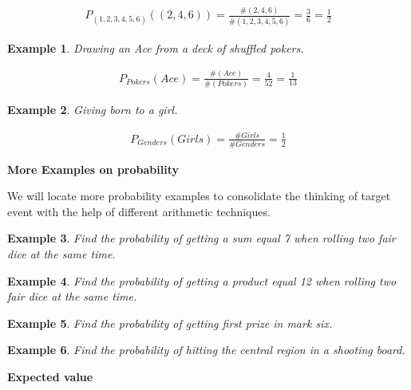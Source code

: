 \documentclass[12pt]{article}
\newtheorem{example}{Example}
\begin{document}
    \begin{align*}
        P_{(1,2,3,4,5,6)}((2,4,6))=\frac{\#(2,4,6)}{\#(1,2,3,4,5,6)}=\frac{3}{6}=\frac{1}{2}
    \end{align*}

    \begin{example}
        Drawing an Ace from a deck of shuffled pokers.
    \end{example}

    \begin{align*}
        P_{Pokers}(Ace)=\frac{\#(Ace)}{\#(Pokers)}=\frac{4}{52}=\frac{1}{13}
    \end{align*}

    \begin{example}
        Giving born to a girl.
    \end{example}

    \begin{align*}
        P_{Genders}(Girls)=\frac{\#Girls}{\#Genders}=\frac{1}{2}
    \end{align*}

    \begin{center}
        \textbf{More Examples on probability}
    \end{center}

    We will locate more probability examples to consolidate the thinking of target event with the help of different arithmetic techniques.

    \begin{example}
        Find the probability of getting a sum equal 7 when rolling two fair dice at the same time.
    \end{example}

    \begin{example}
        Find the probability of getting a product equal 12 when rolling two fair dice at the same time. 
    \end{example}

    \begin{example}
        Find the probability of getting first prize in mark six.
    \end{example}

    \begin{example}
        Find the probability of hitting the central region in a shooting board.
    \end{example}

    \begin{center}
        \textbf{Expected value}
    \end{center}
\end{document}
